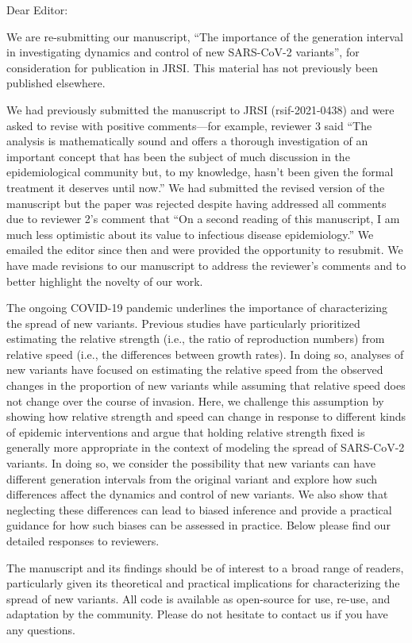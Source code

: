\documentclass[12pt]{article}
\begin{document}
\noindent Dear Editor:

We are re-submitting our manuscript, “The importance of the generation interval in investigating dynamics and control of new SARS-CoV-2 variants”, for consideration for publication in JRSI. This material has not previously been published elsewhere.

We had previously submitted the manuscript to JRSI (rsif-2021-0438) and were asked to revise with positive comments---for example, reviewer 3 said “The analysis is mathematically sound and offers a thorough investigation of an important concept that has been the subject of much discussion in the epidemiological community but, to my knowledge, hasn't been given the formal treatment it deserves until now.” We had submitted the revised version of the manuscript but the paper was rejected despite having addressed all comments due to reviewer 2's comment that “On a second reading of this manuscript, I am much less optimistic about its value to infectious disease epidemiology.” We emailed the editor since then and were provided the opportunity to resubmit.  
We have made revisions to our manuscript to address the reviewer's comments and to better highlight the novelty of our work.

The ongoing COVID-19 pandemic underlines the importance of characterizing the spread of new variants. Previous studies have particularly prioritized estimating the relative strength (i.e., the ratio of reproduction numbers) from relative speed (i.e., the differences between growth rates).
In doing so, analyses of new variants have focused on estimating the relative speed from the observed changes in the proportion of new variants while assuming that relative speed does not change over the course of invasion.
Here, we challenge this assumption by showing how relative strength and speed can change in response to different kinds of epidemic interventions and argue that holding relative strength fixed is generally more appropriate in the context of modeling the spread of SARS-CoV-2 variants.
In doing so, we consider the possibility that new variants can have different generation intervals from the original variant and explore how such differences affect the dynamics and control of new variants. 
We also show that neglecting these differences can lead to biased inference and provide a practical guidance for how such biases can be assessed in practice.
Below please find our detailed responses to reviewers.

The manuscript and its findings should be of interest to a broad range of readers, particularly given its theoretical and practical implications for characterizing the spread of new variants. All code is available as open-source for use, re-use, and adaptation by the community. Please do not hesitate to contact us if you have any questions.
\end{document}
